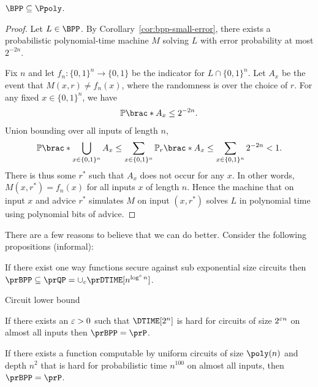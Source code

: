 \begin{corollary}
  $\BPP \subseteq \Ppoly$.
\end{corollary}

\begin{proof}
    Let $L \in \BPP$. By Corollary~\ref{cor:bpp-small-error}, there exists a
    probabilistic polynomial-time machine $M$ solving $L$ with error
    probability at most $2^{-2n}$.

    Fix $n$ and let $f_n : \{0, 1\}^n \to \{0, 1\}$ be the indicator for $L
    \cap \{0, 1\}^n$. Let $A_x$ be the event that $M(x, r) \ne f_n(x)$, where
    the randomness is over the choice of $r$. For any fixed $x \in \{0, 1\}^n$,
    we have
    \begin{align*}
      \Pr\brac*{A_x} \leq 2^{-2n}.
    \end{align*}
    Union bounding over all inputs of length $n$, \[
      \Pr\brac*{\bigcup_{x \in \set{0, 1}^n} A_x}
      \leq \sum_{x \in \set{0,1}^n} \Pr_r\brac*{A_x}
      \leq \sum_{x \in \set{0,1}^n} 2^{-2n}
      < 1.
    \]
    There is thus some $r^*$ such that $A_x$ does not occur for any $x$. In
    other words, $M(x,r^*) = f_n(x)$ for all inputs $x$ of length $n$. Hence the
    machine that on input $x$ and advice $r^*$ simulates $M$ on input $(x,
    r^*)$ solves $L$ in polynomial time using polynomial bits of advice.
\end{proof}

There are a few reasons to believe that we can do better. Consider the following propositions (informal):

\begin{proposition}[BM82,GGM84]
	If there exist one way functions secure against sub exponential size circuits then $\prBPP \subseteq \prQP = \cup_c \prDTIME[n^{\log^c n}]$.
\end{proposition}

Circuit lower bound
\begin{proposition}[IW97]
	If there exists an $\varepsilon>0$ such that $\DTIME[2^n]$ is hard for circuits of size $2^{\varepsilon n}$ on almost all inputs then $\prBPP=\prP$.
\end{proposition}

\begin{proposition}
	If there exists a function computable by uniform circuits of size $\poly(n)$ and depth $n^2$ that is hard for probabilistic time $n^{100}$ on almost all inputs, then $\prBPP = \prP$.
\end{proposition}


